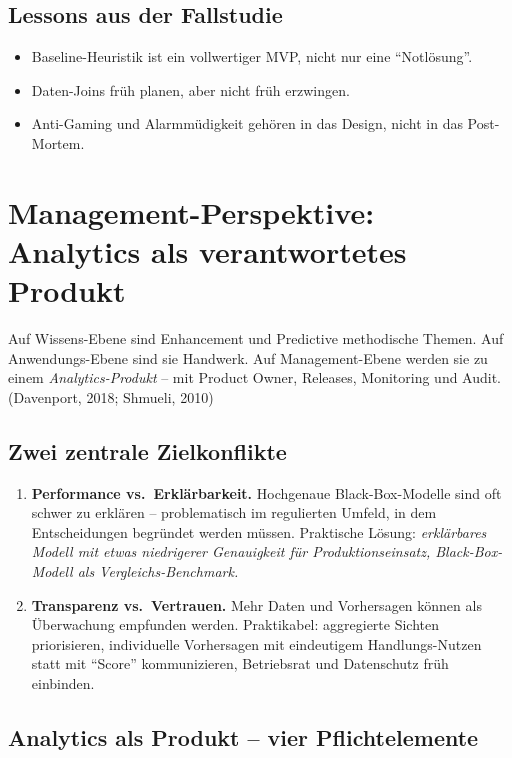 \documentclass[11pt,a4paper,oneside]{article}
\newcommand{\quelle}[1]{{\footnotesize\color{lpGray}(#1)}}
\begin{document}
\subsection{Lessons aus der Fallstudie}

\begin{itemize}
  \item Baseline-Heuristik ist ein vollwertiger MVP, nicht nur eine ``Notlösung''.
  \item Daten-Joins früh planen, aber nicht früh erzwingen.
  \item Anti-Gaming und Alarmmüdigkeit gehören in das Design, nicht in das Post-Mortem.
\end{itemize}

\section{Management-Perspektive: Analytics als verantwortetes Produkt}

Auf Wissens-Ebene sind Enhancement und Predictive methodische Themen. Auf Anwendungs-Ebene sind sie Handwerk. Auf Management-Ebene werden sie zu einem \emph{Analytics-Produkt} -- mit Product Owner, Releases, Monitoring und Audit. \quelle{Davenport, 2018; Shmueli, 2010}

\subsection{Zwei zentrale Zielkonflikte}

\begin{enumerate}
  \item \textbf{Performance vs.\ Erklärbarkeit.} Hochgenaue Black-Box-Modelle sind oft schwer zu erklären -- problematisch im regulierten Umfeld, in dem Entscheidungen begründet werden müssen. Praktische Lösung: \emph{erklärbares Modell mit etwas niedrigerer Genauigkeit für Produktionseinsatz, Black-Box-Modell als Vergleichs-Benchmark.}
  \item \textbf{Transparenz vs.\ Vertrauen.} Mehr Daten und Vorhersagen können als Überwachung empfunden werden. Praktikabel: aggregierte Sichten priorisieren, individuelle Vorhersagen mit eindeutigem Handlungs-Nutzen statt mit ``Score'' kommunizieren, Betriebsrat und Datenschutz früh einbinden.
\end{enumerate}

\subsection{Analytics als Produkt -- vier Pflichtelemente}
\end{document}
